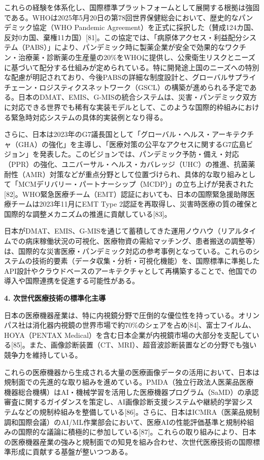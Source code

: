 \documentclass[
  a4paper,
  a4paper,
  11pt]{ltjsbook}
\begin{document}
これらの経験を体系化し、国際標準プラットフォームとして展開する根拠は強固である。WHOは2025年5月20日の第78回世界保健総会において、歴史的なパンデミック協定（WHO
Pandemic
Agreement）を正式に採択した（賛成124カ国、反対0カ国、棄権11カ国）{[}81{]}。この協定では、「病原体アクセス・利益配分システム（PABS）」により、パンデミック時に製薬企業が安全で効果的なワクチン・治療薬・診断薬の生産量の20\%をWHOに提供し、公衆衛生リスクとニーズに基づいて配分する仕組みが定められている。特に開発途上国のニーズへの特別な配慮が明記されており、今後PABSの詳細な制度設計と、グローバルサプライチェーン・ロジスティクスネットワーク（GSCL）の構築が進められる予定である。日本のDMAT、EMIS、G-MISの統合システムは、災害・パンデミック双方に対応できる世界でも稀有な実装モデルとして、このような国際的枠組みにおける緊急時対応システムの具体的実装例となり得る。

さらに、日本は2023年のG7議長国として「グローバル・ヘルス・アーキテクチャ（GHA）の強化」を主導し、「医療対策の公平なアクセスに関するG7広島ビジョン」を発表した。このビジョンでは、パンデミック予防・備え・対応（PPR）の強化、ユニバーサル・ヘルス・カバレッジ（UHC）の推進、抗菌薬耐性（AMR）対策などが重点分野として位置づけられ、具体的な取り組みとして「MCMデリバリー・パートナーシップ（MCDP）」の立ち上げが発表された{[}82{]}。WHO緊急医療チーム（EMT）認証においても、日本の国際緊急援助隊医療チームは2023年11月にEMT
Type
2認証を再取得し、災害時医療の質の確保と国際的な調整メカニズムの推進に貢献している{[}83{]}。

日本がDMAT、EMIS、G-MISを通じて蓄積してきた運用ノウハウ（リアルタイムでの病床稼働状況の可視化、医療物資の需給マッチング、患者搬送の調整等）は、国際的な災害医療・パンデミック対応の参考事例となっている。これらのシステムの技術的要素（データ収集・分析・可視化機能）を、国際標準に準拠したAPI設計やクラウドベースのアーキテクチャとして再構築することで、他国での導入や国際連携を促進する可能性がある。

\textbf{4. 次世代医療技術の標準化主導}

日本の医療機器産業は、特に内視鏡分野で圧倒的な優位性を持っている。オリンパス社は消化器内視鏡の世界市場で約70\%のシェアを占め{[}84{]}、富士フイルム、HOYA（PENTAX
Medical）を含む日本企業が内視鏡市場の大部分を支配している{[}85{]}。また、画像診断装置（CT、MRI）、超音波診断装置などの分野でも強い競争力を維持している。

これらの医療機器から生成される大量の医療画像データの活用において、日本は規制面での先進的な取り組みを進めている。PMDA（独立行政法人医薬品医療機器総合機構）はAI・機械学習を活用した医療機器プログラム（SaMD）の承認審査に関するガイダンスを策定し、AI画像診断支援システムや継続的学習システムなどの規制枠組みを整備している{[}86{]}。さらに、日本はICMRA（医薬品規制調和国際会議）のAI/ML作業部会において、医療AIの性能評価基準と規制枠組みの国際的な議論に積極的に参加している{[}87{]}。これらの取り組みにより、日本の医療機器産業の強みと規制面での知見を組み合わせ、次世代医療技術の国際標準形成に貢献する基盤が整いつつある。
\end{document}
